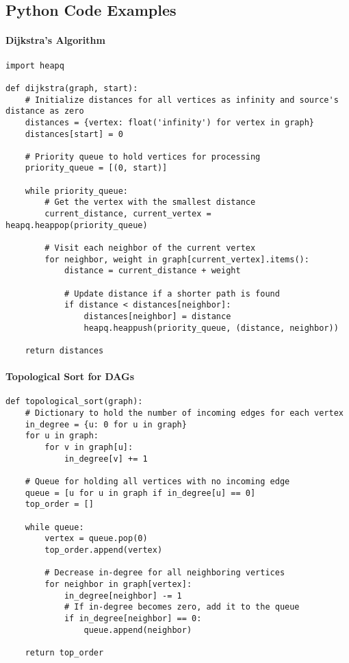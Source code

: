 \documentclass{article}
\begin{document}
\subsection{Python Code Examples}

\paragraph{Dijkstra's Algorithm}

\begin{verbatim}
import heapq

def dijkstra(graph, start):
    # Initialize distances for all vertices as infinity and source's distance as zero
    distances = {vertex: float('infinity') for vertex in graph}
    distances[start] = 0

    # Priority queue to hold vertices for processing
    priority_queue = [(0, start)]
    
    while priority_queue:
        # Get the vertex with the smallest distance
        current_distance, current_vertex = heapq.heappop(priority_queue)

        # Visit each neighbor of the current vertex
        for neighbor, weight in graph[current_vertex].items():
            distance = current_distance + weight

            # Update distance if a shorter path is found
            if distance < distances[neighbor]:
                distances[neighbor] = distance
                heapq.heappush(priority_queue, (distance, neighbor))

    return distances
\end{verbatim}

\paragraph{Topological Sort for DAGs}

\begin{verbatim}
def topological_sort(graph):
    # Dictionary to hold the number of incoming edges for each vertex
    in_degree = {u: 0 for u in graph}
    for u in graph:
        for v in graph[u]:
            in_degree[v] += 1

    # Queue for holding all vertices with no incoming edge
    queue = [u for u in graph if in_degree[u] == 0]
    top_order = []

    while queue:
        vertex = queue.pop(0)
        top_order.append(vertex)

        # Decrease in-degree for all neighboring vertices
        for neighbor in graph[vertex]:
            in_degree[neighbor] -= 1
            # If in-degree becomes zero, add it to the queue
            if in_degree[neighbor] == 0:
                queue.append(neighbor)

    return top_order
\end{verbatim}
\end{document}
